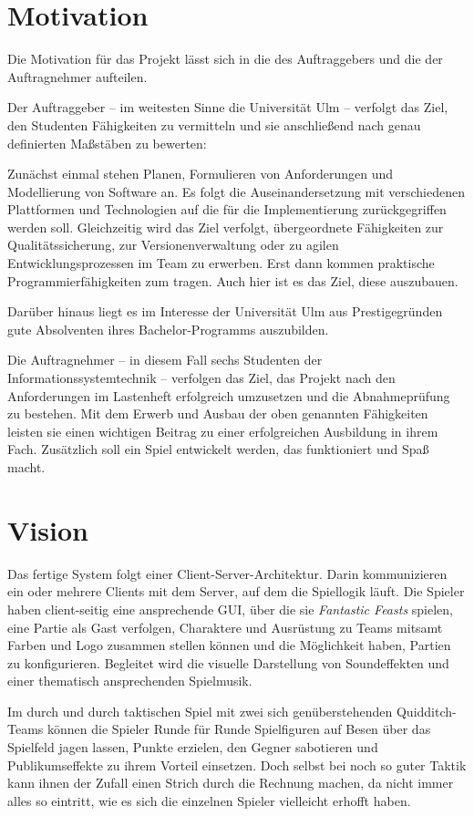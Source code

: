\section{Motivation}
Die Motivation für das Projekt lässt sich in die des Auftraggebers und die der Auftragnehmer aufteilen.

Der Auftraggeber – im weitesten Sinne die Universität Ulm – verfolgt das Ziel, den Studenten Fähigkeiten zu vermitteln und sie anschließend nach genau definierten Maßstäben zu bewerten:

Zunächst einmal stehen Planen, Formulieren von Anforderungen und Modellierung von Software an. Es folgt die Auseinandersetzung mit verschiedenen Plattformen und Technologien auf die für die Implementierung zurückgegriffen werden soll. Gleichzeitig wird das Ziel verfolgt, übergeordnete Fähigkeiten zur Qualitätssicherung, zur Versionenverwaltung oder zu agilen Entwicklungsprozessen im Team zu erwerben. 
Erst dann kommen praktische Programmierfähigkeiten zum tragen. Auch hier ist es das Ziel, diese auszubauen.

Darüber hinaus liegt es im Interesse der Universität Ulm aus Prestigegründen gute Absolventen ihres Bachelor-Programms auszubilden.

Die Auftragnehmer – in diesem Fall sechs Studenten der Informationssystemtechnik – verfolgen das Ziel, das Projekt nach den Anforderungen im Lastenheft erfolgreich umzusetzen und die Abnahmeprüfung zu bestehen. Mit dem Erwerb und Ausbau der oben genannten Fähigkeiten leisten sie einen wichtigen Beitrag zu einer erfolgreichen Ausbildung in ihrem Fach. Zusätzlich soll ein Spiel entwickelt werden, das funktioniert und Spaß macht.
 

\section{Vision}
Das fertige System folgt einer Client-Server-Architektur. Darin kommunizieren ein oder mehrere Clients mit dem Server, auf dem die Spiellogik läuft. Die Spieler haben client-seitig eine ansprechende GUI, über die sie \textit{Fantastic Feasts} spielen, eine Partie als Gast verfolgen, Charaktere und Ausrüstung zu Teams mitsamt Farben und Logo zusammen stellen können und die Möglichkeit haben, Partien zu konfigurieren. Begleitet wird die visuelle Darstellung von Soundeffekten und einer thematisch ansprechenden Spielmusik.

Im durch und durch taktischen Spiel mit zwei sich genüberstehenden Quidditch-Teams können die Spieler Runde für Runde Spielfiguren auf Besen über das Spielfeld jagen lassen, Punkte erzielen, den Gegner sabotieren und Publikumseffekte zu ihrem Vorteil einsetzen. Doch selbst bei noch so guter Taktik kann ihnen der Zufall einen Strich durch die Rechnung machen, da nicht immer alles so eintritt, wie es sich die einzelnen Spieler vielleicht erhofft haben.

